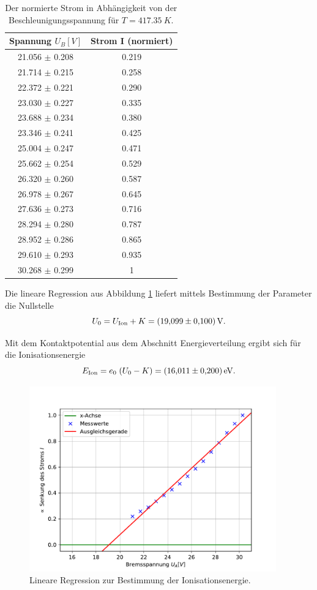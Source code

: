 \begin{table}[H]
  \begin{center}
    \label{tab:ion}
    \begin{tabular}{c|c}
      \textbf{Spannung $U_B [V]$} & \textbf{Strom I (normiert)}\\
      \hline
      21.056 $\pm$ 0.208 & 0.219 \\
      21.714 $\pm$ 0.215 & 0.258 \\
      22.372 $\pm$ 0.221 & 0.290 \\
      23.030 $\pm$ 0.227 & 0.335 \\
      23.688 $\pm$ 0.234 & 0.380 \\
      23.346 $\pm$ 0.241 & 0.425 \\
      25.004 $\pm$ 0.247 & 0.471 \\
      25.662 $\pm$ 0.254 & 0.529 \\
      26.320 $\pm$ 0.260 & 0.587 \\
      26.978 $\pm$ 0.267 & 0.645 \\
      27.636 $\pm$ 0.273 & 0.716 \\
      28.294 $\pm$ 0.280 & 0.787 \\
      28.952 $\pm$ 0.286 & 0.865 \\
      29.610 $\pm$ 0.293 & 0.935 \\
      30.268 $\pm$ 0.299 & 1
    \end{tabular}
    \caption{Der normierte Strom in Abhängigkeit von der Beschleunigungsspannung für $T = \SI{417.35}{K}$.}
  \end{center}
\end{table}

Die lineare Regression aus Abbildung \ref{fig:ion} liefert mittels Bestimmung der Parameter die Nullstelle
\begin{equation}
  U_0 = U_\text{Ion} + K = \SI{19.099 \pm 0.1}{V}. \notag
\end{equation}

Mit dem Kontaktpotential aus dem Abschnitt Energieverteilung ergibt sich für die Ionisationsenergie
\begin{equation}
  E_\text{Ion} = e_0 \; (U_0 - K) = \SI{16.011 \pm 0.2}{eV}. \notag
\end{equation}

\begin{figure}[h]
  \centering
  \includegraphics[height=8cm]{Auswertung/regression.pdf}
  \caption{Lineare Regression zur Bestimmung der Ionisationsenergie.}
  \label{fig:ion}
\end{figure}
